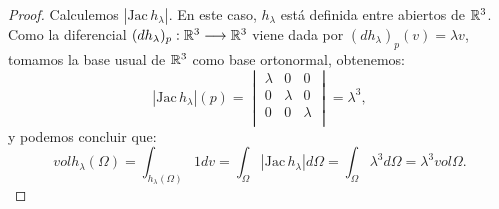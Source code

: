 \begin{proof}
Calculemos $|\text{Jac} \, h_\lambda|$. En este caso, $h_\lambda$ está definida entre abiertos de $\mathbb{R}^3$. Como la diferencial $(dh_\lambda)_p: \mathbb{R}^3 \longrightarrow \mathbb{R}^3$ viene dada por $(dh_\lambda)_p(v) = \lambda v$, tomamos la base usual de $\mathbb{R}^3$ como base ortonormal, obtenemos:
%
\begin{equation*}
  |\text{Jac} \, h_\lambda|(p) = \begin{vmatrix}
                        \lambda & 0 & 0 \\ 
                        0 & \lambda & 0 \\
                        0 & 0 & \lambda \\
                        \end{vmatrix} = \lambda^3,
\end{equation*}
%
y podemos concluir que:
%
\begin{equation*}
    vol h_\lambda(\Omega) = \int_{h_\lambda(\Omega)} 1dv = \int_{\Omega} |\text{Jac} \, h_\lambda| d\Omega = \int_{\Omega} \lambda^3 d\Omega = \lambda^3 vol \Omega.
\end{equation*}

\end{proof}


